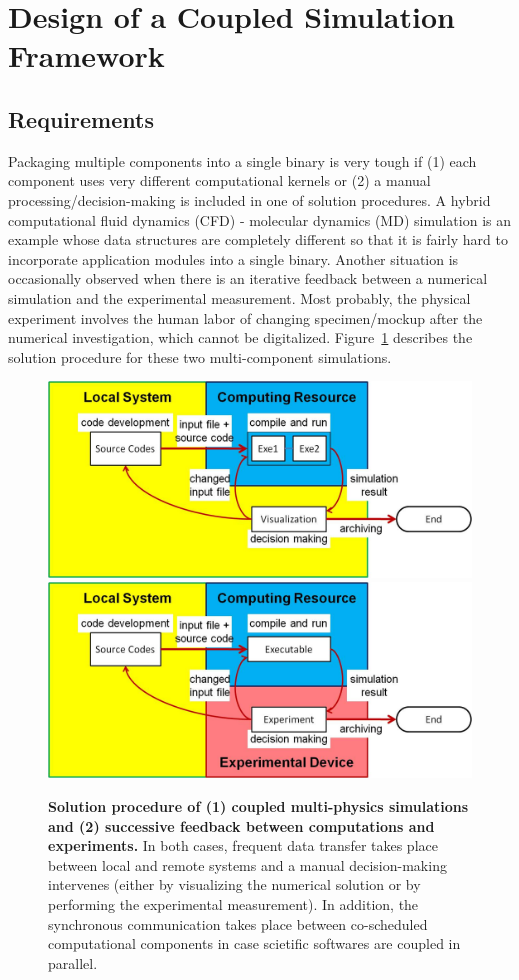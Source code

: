 \documentclass[10pt,conference]{IEEEtran}
\begin{document}
\section{Design of a Coupled Simulation Framework}
\label{sec:design}

\subsection{Requirements}
Packaging multiple components into a single binary is very tough if (1) 
each component uses very different computational kernels or (2) a 
manual processing/decision-making is included in one of solution 
procedures. A hybrid computational fluid dynamics (CFD) - molecular 
dynamics (MD) simulation is an example whose data structures are 
completely different so that it is fairly hard to incorporate 
application modules into a single binary. Another situation is 
occasionally observed when there is an iterative feedback between a 
numerical simulation and the experimental measurement. Most probably, 
the physical experiment involves the human labor of changing 
specimen/mockup after the numerical investigation, which cannot be 
digitalized. Figure~\ref{Fig:Overall_Flow} describes the solution 
procedure for these two multi-component simulations.


\begin{figure}[ht]
\centering
\includegraphics[width=0.8\linewidth]{Flow_Multiphysics_Simulation.jpg}
\vskip 0.2cm
\includegraphics[width=0.8\linewidth]{Flow_Exp_and_Comp.jpg}
\vskip-0.2cm
\caption{\small 
{\bf Solution procedure of (1) coupled multi-physics simulations and 
(2) successive feedback between computations and experiments.} 
In both cases, frequent data transfer takes place between local and 
remote systems and a manual decision-making intervenes (either by 
visualizing the numerical solution or by performing the experimental 
measurement). In addition, the synchronous communication takes place
between co-scheduled computational components in case scietific 
softwares are coupled in parallel.}
\label{Fig:Overall_Flow}
\end{figure}
\end{document}
